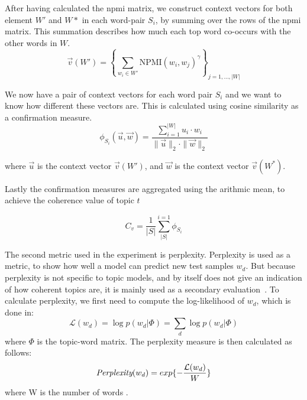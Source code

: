 After having calculated the \gls{npmi} matrix, we construct context vectors for both element $W'$ and $W*$ in each word-pair $S_i$, by summing over the rows of the \gls{npmi} matrix.
This summation describes how much each top word co-occurs with the other words in $W$.
\begin{equation}\label{eq:coherence_1}
	\overrightarrow{v}(W') = \left\{ \sum_{w_i \in W'} \text{NPMI}(w_i, w_j)^{\gamma} \right\}_{j=1,\dots,|W|}
\end{equation}

We now have a pair of context vectors for each word pair $S_i$ and we want to know how different these vectors are.
This is calculated using cosine similarity as a confirmation measure.
\begin{equation}\label{eq:coherence_3}
	\phi_{S_i}(\overrightarrow{u}, \overrightarrow{w}) = \frac
	{\sum_{i = 1}^{|W|} u_i \cdot w_i}
	{\|\overrightarrow{u}\|_2 \cdot \|\overrightarrow{w}\|_2}
\end{equation}

\noindent where $\overrightarrow{u}$ is the context vector $\overrightarrow{v}(W')$, and $\overrightarrow{w}$ is the context vector $\overrightarrow{v}(W^*)$.

Lastly the confirmation measures are aggregated using the arithmic mean, to achieve the coherence value of topic $t$

\begin{equation}\label{eq:coherence_4}
	C_v = \frac{1}{|S|}\sum_{|S|}^{i=1}\phi_{S_i}
\end{equation}

The second metric used in the experiment is perplexity.
Perplexity is used as a metric, to show how well a model can predict new test samples $w_d$.
But because perplexity is not specific to topic models, and by itself does not give an indication of how coherent topics are, it is mainly used as a secondary evaluation~\cite{tea_leaves}.
To calculate perplexity, we first need to compute the log-likelihood of $w_d$, which is done in:
\begin{equation}\label{eq:likelihood}
	\mathcal{L}(w_d) = \log p(w_d|\Phi) = \sum_{d} \log p(w_d|\Phi)
\end{equation}
\noindent where $\Phi$ is the topic-word matrix.
The perplexity measure is then calculated as follows:
\begin{equation}
	\emph{Perplexity}(w_d) = exp \{-\frac{\mathcal{L}(w_d)}{W}\}
\end{equation}
\noindent where W is the number of words \cite{de2008evaluating}.


